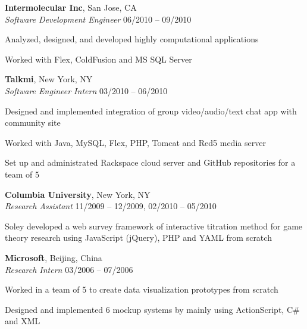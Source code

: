 \documentclass[margin,line]{resume}
\begin{document}
\begin{resume}
    \textbf{Intermolecular Inc}, San Jose, CA \\
    \textsl{Software Development Engineer} \hfill 06/2010 -- 09/2010 \vspace{-3mm}\\\vspace{-1mm}%
      \begin{list2}
      \item Analyzed, designed, and developed highly computational applications
      \item Worked with Flex, ColdFusion and MS SQL Server
      \end{list2}

    \textbf{Talkmi}, New York, NY \\
    \textsl{Software Engineer Intern} \hfill 03/2010 -- 06/2010 \vspace{-3mm}\\\vspace{-1mm}%
      \begin{list2}
      \item Designed and implemented integration of group video/audio/text chat app with community site
      \item Worked with Java, MySQL, Flex, PHP, Tomcat and Red5 media server	    
      \item Set up and administrated Rackspace cloud server and GitHub repositories for a team of 5
      \end{list2}

    \textbf{Columbia University}, New York, NY \\
    \textsl{Research Assistant} \hfill 11/2009 -- 12/2009, 02/2010 -- 05/2010 \vspace{-3mm}\\\vspace{-1mm}%
      \begin{list2} 
      \item Soley developed a web survey framework of interactive titration method for game theory research using JavaScript (jQuery), PHP and YAML from scratch
      \end{list2}

    \textbf{Microsoft}, Beijing, China \\
    \textsl{Research Intern} \hfill 03/2006 -- 07/2006 \vspace{-3mm}\\\vspace{-1mm}%
      \begin{list2}
      \item Worked in a team of 5 to create data visualization prototypes from scratch
      \item Designed and implemented 6 mockup systems by mainly using ActionScript, C\# and XML
      \end{list2}


\end{resume}
\end{document}
